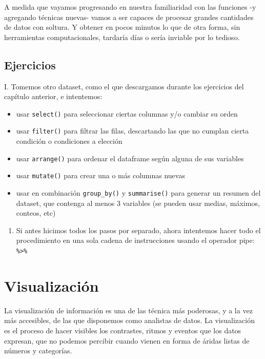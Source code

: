 \documentclass[spanish,]{book}
\providecommand{\tightlist}{%
  \setlength{\itemsep}{0pt}\setlength{\parskip}{0pt}}
\begin{document}
A medida que vayamos progresando en nuestra familiaridad con las funciones -y agregando técnicas nuevas- vamos a ser capaces de procesar grandes cantidades de datos con soltura. Y obtener en pocos minutos lo que de otra forma, sin herramientas computacionales, tardaría días o sería inviable por lo tedioso.

\hypertarget{ejercicios-1}{%
\section{Ejercicios}\label{ejercicios-1}}

I. Tomemos otro dataset, como el que descargamos durante los ejercicios del capítulo anterior, e intentemos:

\begin{itemize}
\tightlist
\item
  usar \texttt{select()} para seleccionar ciertas columnas y/o cambiar su orden
\item
  usar \texttt{filter()} para filtrar las filas, descartando las que no cumplan cierta condición o condiciones a elección
\item
  usar \texttt{arrange()} para ordenar el dataframe según alguna de sus variables
\item
  usar \texttt{mutate()} para crear una o más columnas nuevas
\item
  usar en combinación \texttt{group\_by()} y \texttt{summarise()} para generar un resumen del dataset, que contenga al menos 3 variables (se pueden usar medias, máximos, conteos, etc)
\end{itemize}

\begin{enumerate}
\def\labelenumi{\Roman{enumi}.}
\setcounter{enumi}{1}
\tightlist
\item
  Si antes hicimos todos los pasos por separado, ahora intentemos hacer todo el procedimiento en una sola cadena de instrucciones usando el operador pipe: \texttt{\%\textgreater{}\%}
\end{enumerate}

\hypertarget{visualizaciuxf3n}{%
\chapter{Visualización}\label{visualizaciuxf3n}}

La visualización de información es una de las técnica más poderosas, y a la vez más accesibles, de las que disponemos como analistas de datos. La visualización es el proceso de hacer visibles los contrastes, ritmos y eventos que los datos expresan, que no podemos percibir cuando vienen en forma de áridas listas de números y categorías.
\end{document}
